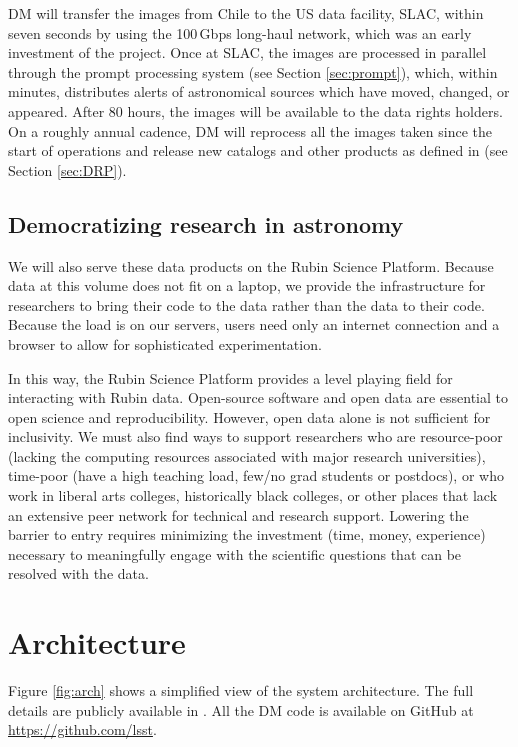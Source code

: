\documentclass[11pt,twoside]{article}
\begin{document}
DM will transfer the images from Chile to the US data facility, SLAC, within seven seconds by using the 100\,Gbps long-haul network, which was an early investment of the project.
Once at SLAC, the images are processed in parallel through the prompt processing system (see Section \ref{sec:prompt}), which, within minutes, distributes alerts of astronomical sources which have moved, changed, or appeared.
After 80 hours, the images will be available to the data rights holders.
On a roughly annual cadence, DM will reprocess all the images taken since the start of operations and release new catalogs and other products as defined in \citet{LSE-163} (see Section \ref{sec:DRP}).


\subsection{Democratizing research in astronomy}

We will also serve these data products on the Rubin Science Platform.
Because data at this volume does not fit on a laptop, we provide the infrastructure for researchers to bring their code to the data rather than the data to their code.
Because the load is on our servers, users need only an internet connection and a browser to allow for sophisticated experimentation.

In this way, the Rubin Science Platform provides a level playing field for interacting with Rubin data.
Open-source software and open data are essential to open science and reproducibility. However, open data alone is not sufficient for inclusivity.
We must also find ways to support researchers who are resource-poor (lacking the computing resources associated with major research universities), time-poor (have a high teaching load, few/no grad students or postdocs), or who work in liberal arts colleges, historically black colleges, or other places that lack an extensive peer network for technical and research support.
Lowering the barrier to entry requires minimizing the investment (time, money, experience) necessary to meaningfully engage with the scientific questions that can be resolved with the data.

\section{Architecture}

Figure \ref{fig:arch} shows a simplified view of the system architecture. The full details are publicly available in \citep{LDM-148}. All the DM code is available on GitHub at \url{https://github.com/lsst}.
\end{document}
